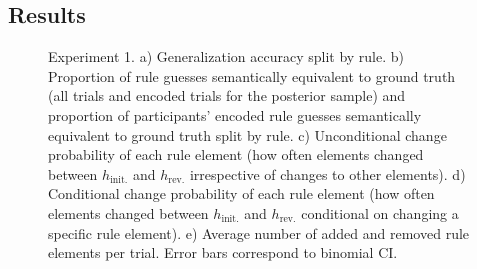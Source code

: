 \documentclass[doc,natbib,floatsintext]{apa7}
\newcommand{\hr}{h_{\mathrm{rev.}}}
\newcommand{\hi}{h_{\mathrm{init.}}}
\begin{document}
\subsection{Results}

\begin{figure}[!t]
    \begin{center}
    \end{center}
    \caption{Experiment 1. a) Generalization accuracy split by rule. b) Proportion of rule guesses semantically equivalent to ground truth (all trials and encoded trials for the posterior sample) and proportion of participants' encoded rule guesses semantically equivalent to ground truth split by rule. c) Unconditional change probability of each rule element (how often elements changed between $\hi$ and $\hr$ irrespective of changes to other elements). d) Conditional change probability of each rule element (how often elements changed between $\hi$ and $\hr$ conditional on changing a specific rule element). e) Average number of added and removed rule elements per trial. Error bars correspond to binomial CI.}
    \label{fig:fig_5_exp_1_behavioural_res}
\end{figure}
\end{document}
